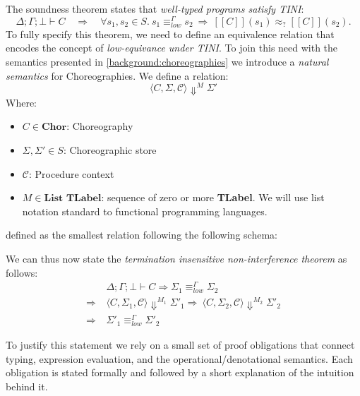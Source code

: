 \documentclass[12pt,a4paper,twoside]{book}
\newcommand{\llbracket}{[\![}
\newcommand{\rrbracket}{]\!]}
\begin{document}
The soundness theorem states that \emph{well-typed programs satisfy TINI}:
\[
  \Delta;\Gamma;\bot \vdash C
  \quad\Longrightarrow\quad
  \forall s_1,s_2 \in S.\ s_1 \equiv^\Gamma_{low} s_2 \ \Rightarrow\ \llbracket C \rrbracket(s_1) \approx_? \llbracket C \rrbracket(s_2).
\]
To fully specify this theorem, we need to define an equivalence relation that encodes the concept of \emph{low-equivance under TINI}.
To join this need with the semantics presented in \ref{background:choreographies} we introduce a \emph{natural semantics}\cite{kahn1987natural} for Choreographies. We define a relation:
$$
\langle C, \Sigma, \mathscr{C} \rangle \Downarrow^M \Sigma'
$$
Where:
\begin{itemize}
	\item $C \in \textbf{Chor}$: Choreography
	\item $\Sigma, \Sigma' \in S$: Choreographic store
	\item $\mathscr{C}$: Procedure context
	\item $M \in \textbf{List TLabel}$: sequence of zero or more \textbf{TLabel}. We will use list notation standard to functional programming languages.
\end{itemize}
defined as the smallest relation following the following schema:

We can thus now state the \emph{termination insensitive non-interference theorem} as follows:
\begin{align*}
	&\Delta;\Gamma;\bot \vdash C \Rightarrow
	\Sigma_1 \equiv^\Gamma_{low} \Sigma_2 \\ \Rightarrow\ &\langle C, \Sigma_1, \mathscr{C}\rangle \Downarrow^{M_1} \Sigma'_1
	\Rightarrow\ \langle C, \Sigma_2, \mathscr{C}\rangle \Downarrow^{M_2} \Sigma'_2 \\ \Rightarrow\ &\Sigma'_1 \equiv^\Gamma_{low} \Sigma'_2
\end{align*}




\medskip

\noindent
To justify this statement we rely on a small set of proof obligations that connect typing, expression evaluation, and the operational/denotational semantics. Each obligation is stated formally and followed by a short explanation of the intuition behind it.
\end{document}
